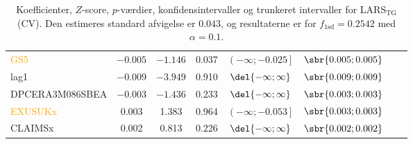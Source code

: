 \begin{table}[ht]
{\begin{tabular}{lccccccc}
\textcolor{orange}{GS5} & $-0.005$ & $-1.146 $ &0.037 &     $\left( -\infty ;  -0.025\right]   $ & $\sbr{0.005 ;0.005 }$\\  
 \textcolor{blue3}{lag1}  & $-0.009$  &$-3.949$   & 0.910   & $\del{-\infty  ;  \infty }$  &$\sbr{0.009; 0.009 }$ \\ 
 \textcolor{red3}{DPCERA3M086SBEA} & $- 0.003$ & $-1.436$ & 0.233  &   $\del{-\infty   ;  \infty }$ &  $\sbr{0.003; 0.003}$ \\ 
\textcolor{orange}{ EXUSUKx}  &  0.003   &1.383 & 0.964   &   $\left( -\infty     ;-0.053 \right] $&  $\sbr{0.003; 0.003 }$   \\   
 \textcolor{blue3}{CLAIMSx} &0.002 &  0.813   & 0.226 &    $\del{-\infty  ;  \infty}$& $\sbr{0.002 ;0.002 }$   \\ 
\bottomrule
\end{tabular}  
}
\caption{Koefficienter, \(Z\)-score, \(p\)-værdier, konfidensintervaller og trunkeret intervaller for LARS$_{\text{TG}}$ (CV). Den estimeres standard afvigelse er \(0.043\), og resultaterne er for \(f_{1 \text{sd}} = 0.2542\) med \(\alpha = 0.1\).} \label{tab:larInf_kryds}
\end{table} 
